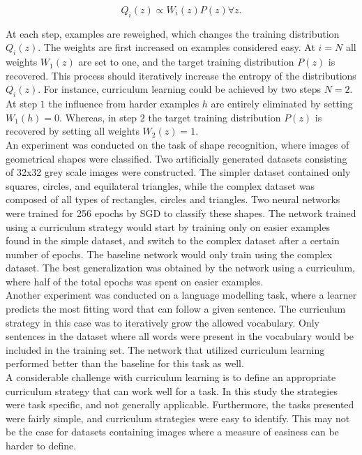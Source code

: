$$Q_{i}(z)\propto W_{i}(z)P(z)\forall z.$$

At each step, examples are reweighed, which changes the training distribution $Q_{i}(z)$. The weights are first increased on examples considered easy.  
At $i=N$ all weights $W_{1}(z)$ are set to one, and the target training distribution $P(z)$ is recovered. This process should iteratively increase the entropy of the distributions $Q_{i}(z)$. For instance, curriculum learning could be achieved by two steps $N=2$. At step $1$ the influence from harder examples $h$ are entirely eliminated by setting $W_{1}(h) = 0$. Whereas, in step $2$ the target training distribution $P(z)$ is recovered by setting all weights $W_{2}(z) = 1$.\\


An experiment was conducted on the task of shape recognition, where images of geometrical shapes were classified. Two artificially generated datasets consisting of 32x32 grey scale images were constructed. The simpler dataset contained only squares, circles, and equilateral triangles, while the complex dataset was composed of all types of rectangles, circles and triangles. Two neural networks were trained for 256 epochs by \ac{SGD} to classify these shapes. The network trained using a curriculum strategy would start by training only on easier examples found in the simple dataset, and switch to the complex dataset after a certain number of epochs. The baseline network would only train using the complex dataset. The best generalization was obtained by the network using a curriculum, where half of the total epochs was spent on easier examples. \\

Another experiment was conducted on a language modelling task, where a learner predicts the most fitting word that can follow a given sentence. The curriculum strategy in this case was to iteratively grow the allowed vocabulary. Only sentences in the dataset where all words were present in the vocabulary would be included in the training set. The network that utilized curriculum learning performed better than the baseline for this task as well.\\

A considerable challenge with curriculum learning is to define an appropriate curriculum strategy that can work well for a task. In this study the strategies were task specific, and not generally applicable. Furthermore, the tasks presented were fairly simple, and curriculum strategies were easy to identify. This may not be the case for datasets containing images where a measure of easiness can be harder to define.\\


